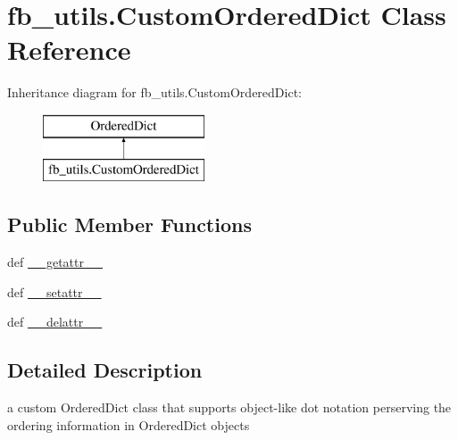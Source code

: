 \hypertarget{classfb__utils_1_1CustomOrderedDict}{\section{fb\-\_\-utils.\-Custom\-Ordered\-Dict Class Reference}
\label{classfb__utils_1_1CustomOrderedDict}
}
Inheritance diagram for fb\-\_\-utils.\-Custom\-Ordered\-Dict\-:\begin{figure}[H]
\begin{center}
\leavevmode
\includegraphics[height=2.000000cm]{classfb__utils_1_1CustomOrderedDict}
\end{center}
\end{figure}
\subsection*{Public Member Functions}
\begin{DoxyCompactItemize}
\item 
def \hyperlink{classfb__utils_1_1CustomOrderedDict_a198a41b0e78b5b3601747d6a463842cc}{\-\_\-\-\_\-getattr\-\_\-\-\_\-}
\item 
def \hyperlink{classfb__utils_1_1CustomOrderedDict_af91ffee0e17db9870195943378bb5418}{\-\_\-\-\_\-setattr\-\_\-\-\_\-}
\item 
def \hyperlink{classfb__utils_1_1CustomOrderedDict_a10a2c8eaad27d604efcab62d8a21f4b0}{\-\_\-\-\_\-delattr\-\_\-\-\_\-}
\end{DoxyCompactItemize}


\subsection{Detailed Description}
\begin{DoxyVerb}    a custom OrderedDict class that supports object-like dot notation
    perserving the ordering information in OrderedDict objects
\end{DoxyVerb}
 

